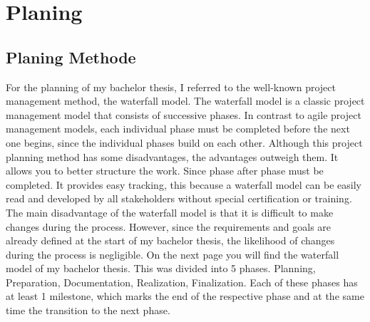 \chapter{Planing}
\section{Planing Methode}
For the planning of my bachelor thesis, I referred to the well-known project management method, the waterfall model. The waterfall model is a classic project management model that consists of successive phases. In contrast to agile project management models, each individual phase must be completed before the next one begins, since the individual phases build on each other. 
Although this project planning method has some disadvantages, the advantages outweigh them.
It allows you to better structure the work. Since phase after phase must be completed. It provides easy tracking, this because a waterfall model can be easily read and developed by all stakeholders without special certification or training.
The main disadvantage of the waterfall model is that it is difficult to make changes during the process. However, since the requirements and goals are already defined at the start of my bachelor thesis, the likelihood of changes during the process is negligible. 
\newline
On the next page you will find the waterfall model of my bachelor thesis. This was divided into 5 phases. Planning, Preparation, Documentation, Realization, Finalization.
Each of these phases has at least 1 milestone, which marks the end of the respective phase and at the same time the transition to the next phase.

